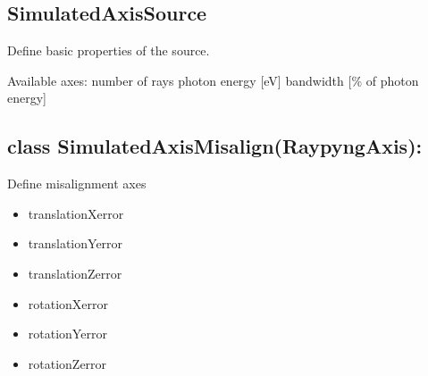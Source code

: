 \documentclass[letterpaper,10pt,english]{sphinxmanual}
\begin{document}
\subsection{SimulatedAxisSource}
\label{\detokenize{API:simulatedaxissource}}

\begin{fulllineitems}
\label{\detokenize{API:raypyng_bluesky.axes.SimulatedAxisSource}}
\pysigstartsignatures
{}
\pysigstopsignatures
\sphinxAtStartPar
Define basic properties of the source.

\sphinxAtStartPar
Available axes:
\sphinxhyphen{} number of rays
\sphinxhyphen{} photon energy {[}eV{]}
\sphinxhyphen{} bandwidth {[}\% of photon energy{]}

\end{fulllineitems}



\subsection{class SimulatedAxisMisalign(RaypyngAxis):}
\label{\detokenize{API:class-simulatedaxismisalign-raypyngaxis}}

\begin{fulllineitems}
\label{\detokenize{API:raypyng_bluesky.axes.SimulatedAxisMisalign}}
\pysigstartsignatures
{}
\pysigstopsignatures
\sphinxAtStartPar
Define misalignment axes
\begin{itemize}
\item {} 
\sphinxAtStartPar
translationXerror

\item {} 
\sphinxAtStartPar
translationYerror

\item {} 
\sphinxAtStartPar
translationZerror

\item {} 
\sphinxAtStartPar
rotationXerror

\item {} 
\sphinxAtStartPar
rotationYerror

\item {} 
\sphinxAtStartPar
rotationZerror

\end{itemize}

\end{fulllineitems}
\end{document}
